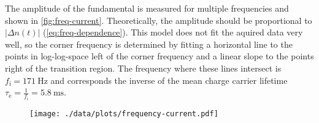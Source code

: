 The amplitude of the fundamental is measured for multiple frequencies and shown in \autoref{fig:freq-current}.
Theoretically, the amplitude should be proportional to $|\Delta n(t)|$ (\autoref{eq:freq-dependence}).
This model does not fit the aquired data very well, so the corner frequency is determined by fitting a horizontal line to the points in log-log-space left of the corner frequency and a linear slope to the points right of the transition region.
The frequency where these lines intersect is $f_\text{i} = \SI{171}{\hertz}$ and corresponds the inverse of the mean charge carrier lifetime $\tau_\text{e} = \frac{1}{f_\text{i}} = \SI{5.8}{\milli\second}$.
\begin{figure}
	\centering
	\texttt{[image: ./data/plots/frequency-current.pdf]}
	\label{fig:freq-current}
\end{figure}
